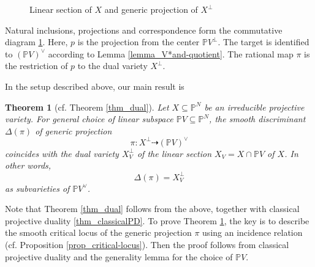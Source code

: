 \documentclass[12pt]{amsart}
\newtheorem{theorem}{Theorem}[section]
\begin{document}
\begin{figure}[ht]
    \centering
{}
\caption{Linear section of $X$ and generic projection of $X^{\perp}$\label{fig:generic-projection}}
\end{figure}

Natural inclusions, projections and correspondence form the commutative diagram \ref{fig:generic-projection}. Here, $p$ is the projection from the center $\mathbb PV^{\perp}$. The target is identified to $(\mathbb PV)^{\vee}$ according to Lemma \ref{lemma_V*and-quotient}. The rational map $\pi$ is the restriction of $p$ to the dual variety $X^{\perp}$.


In the setup described above, our main result is 

\begin{theorem}[cf. Theorem \ref{thm_dual}]\label{thm_mainthmequiv} Let $X\subseteq\mathbb P^N$ be an irreducible projective variety.
For general choice of linear subspace $\mathbb PV\subseteq \mathbb P^N$, the smooth discriminant $\Delta(\pi)$ of generic projection $$\pi:X^{\perp}\dashrightarrow  (\mathbb PV)^{\vee}$$ coincides with the dual variety $X^{\perp}_V$ of the linear section $X_V=X\cap \mathbb PV$ of $X$. In other words, 
$$\Delta(\pi)= X_V^{\perp}$$
as subvarieties of $\mathbb PV^{\vee}$.
\end{theorem}

Note that Theorem \ref{thm_dual} follows from the above, together with classical projective duality \ref{thm_classicalPD}. To prove Theorem \ref{thm_mainthmequiv}, the key is to describe the smooth critical locus of the generic projection $\pi$ using an incidence relation (cf. Proposition \ref{prop_critical-locus}). Then the proof follows from classical projective duality and the generality lemma for the choice of $\mathbb PV$.
\end{document}
